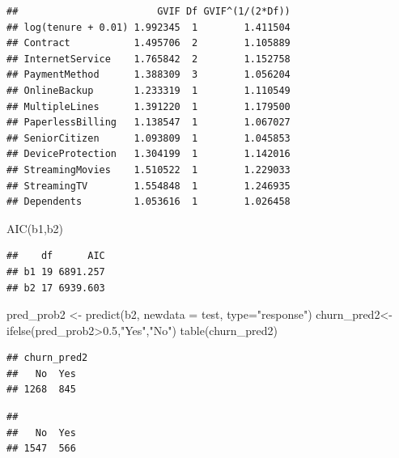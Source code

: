 \documentclass[
  twoside]{article}
\newenvironment{Shaded}{\begin{snugshade}}{\end{snugshade}}
\newcommand{\AttributeTok}[1]{\textcolor[rgb]{0.77,0.63,0.00}{#1}}
\newcommand{\FloatTok}[1]{\textcolor[rgb]{0.00,0.00,0.81}{#1}}
\newcommand{\FunctionTok}[1]{\textcolor[rgb]{0.00,0.00,0.00}{#1}}
\newcommand{\NormalTok}[1]{#1}
\newcommand{\OtherTok}[1]{\textcolor[rgb]{0.56,0.35,0.01}{#1}}
\newcommand{\SpecialCharTok}[1]{\textcolor[rgb]{0.00,0.00,0.00}{#1}}
\newcommand{\StringTok}[1]{\textcolor[rgb]{0.31,0.60,0.02}{#1}}
\begin{document}
\begin{verbatim}
##                        GVIF Df GVIF^(1/(2*Df))
## log(tenure + 0.01) 1.992345  1        1.411504
## Contract           1.495706  2        1.105889
## InternetService    1.765842  2        1.152758
## PaymentMethod      1.388309  3        1.056204
## OnlineBackup       1.233319  1        1.110549
## MultipleLines      1.391220  1        1.179500
## PaperlessBilling   1.138547  1        1.067027
## SeniorCitizen      1.093809  1        1.045853
## DeviceProtection   1.304199  1        1.142016
## StreamingMovies    1.510522  1        1.229033
## StreamingTV        1.554848  1        1.246935
## Dependents         1.053616  1        1.026458
\end{verbatim}

\begin{Shaded}
\begin{Highlighting}[]
\FunctionTok{AIC}\NormalTok{(b1,b2)}
\end{Highlighting}
\end{Shaded}

\begin{verbatim}
##    df      AIC
## b1 19 6891.257
## b2 17 6939.603
\end{verbatim}

\begin{Shaded}
\begin{Highlighting}[]
\NormalTok{pred\_prob2 }\OtherTok{\textless{}{-}} \FunctionTok{predict}\NormalTok{(b2, }\AttributeTok{newdata =}\NormalTok{ test, }\AttributeTok{type=}\StringTok{"response"}\NormalTok{)}
\NormalTok{churn\_pred2}\OtherTok{\textless{}{-}} \FunctionTok{ifelse}\NormalTok{(pred\_prob2}\SpecialCharTok{\textgreater{}}\FloatTok{0.5}\NormalTok{,}\StringTok{"Yes"}\NormalTok{,}\StringTok{"No"}\NormalTok{)}
\FunctionTok{table}\NormalTok{(churn\_pred2)}
\end{Highlighting}
\end{Shaded}

\begin{verbatim}
## churn_pred2
##   No  Yes 
## 1268  845
\end{verbatim}

\begin{Shaded}
\end{Shaded}

\begin{verbatim}
## 
##   No  Yes 
## 1547  566
\end{verbatim}
\end{document}
